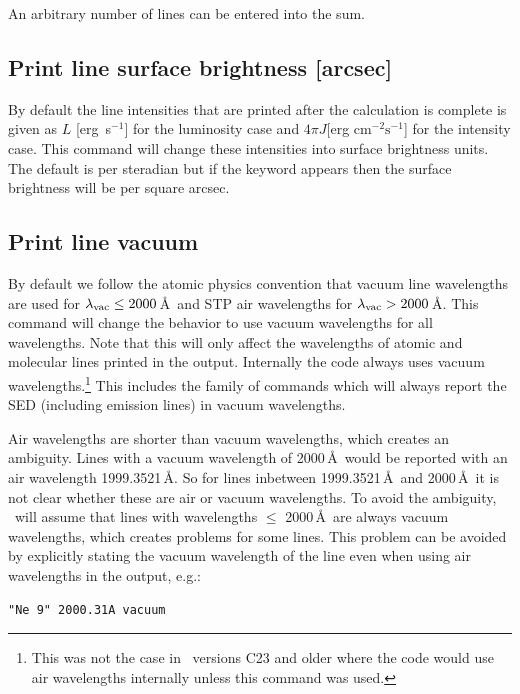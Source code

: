 An arbitrary number of lines can be entered into the sum.

\subsection{Print line surface brightness [arcsec]}
\label{sec:CommandPrintLineSurfaceBrightness}

By default the line intensities that are printed after the calculation
is complete is given as $L$ [erg~s$^{-1}$] for the luminosity case and
$4\pi J$[erg cm$^{-2} \mathrm{s}^{-1}$] for the intensity case.
This command will change these
intensities into surface brightness units.
The default is per steradian
but if the keyword  appears then the surface brightness will be per square arcsec.

\subsection{Print line vacuum}
\label{sec:CommandPrintVacuum}
By default we follow the atomic physics convention that vacuum line wavelengths are used
for $\lambda_{\rm vac} \le 2000$\,\AA\ and STP air wavelengths for $\lambda_{\rm vac} > 2000$\,\AA.
This command will change the behavior to use vacuum wavelengths for all wavelengths.
Note that this will only affect the wavelengths of atomic and molecular lines
printed in the output. Internally the code always uses vacuum wavelengths.\footnote{This
  was not the case in \Cloudy\ versions C23 and older where the code would use air wavelengths
  internally unless this command was used.}
This includes the  family of commands which will
always report the SED (including emission lines) in vacuum wavelengths.

Air wavelengths are shorter than vacuum wavelengths, which creates an ambiguity. Lines with
a vacuum wavelength of 2000\,\AA\ would be reported with an air wavelength 1999.3521\,\AA. So
for lines inbetween 1999.3521\,\AA\ and 2000\,\AA\ it is not clear whether these are air or
vacuum wavelengths. To avoid the ambiguity, \Cloudy\ will assume that lines with wavelengths
$\le$ 2000\,\AA\ are always vacuum wavelengths, which creates problems for some lines. This
problem can be avoided by explicitly stating the vacuum wavelength of the line even when
using air wavelengths in the output, e.g.:
\begin{verbatim}
"Ne 9" 2000.31A vacuum
\end{verbatim}

